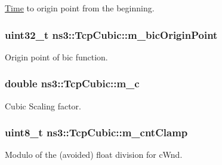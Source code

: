 \hyperlink{classns3_1_1Time}{Time} to origin point from the beginning. 

\subsubsection[{\texorpdfstring{m\+\_\+bic\+Origin\+Point}{m_bicOriginPoint}}]{\setlength{\rightskip}{0pt plus 5cm}uint32\+\_\+t ns3\+::\+Tcp\+Cubic\+::m\+\_\+bic\+Origin\+Point\hspace{0.3cm}{\ttfamily [private]}}\hypertarget{classns3_1_1TcpCubic_a10fb71cdb4155d6e61174690e6bc295a}{}\label{classns3_1_1TcpCubic_a10fb71cdb4155d6e61174690e6bc295a}


Origin point of bic function. 

\subsubsection[{\texorpdfstring{m\+\_\+c}{m_c}}]{\setlength{\rightskip}{0pt plus 5cm}double ns3\+::\+Tcp\+Cubic\+::m\+\_\+c\hspace{0.3cm}{\ttfamily [private]}}\hypertarget{classns3_1_1TcpCubic_acb9bb68447f9a9e0eb0cb1f95eb7aca7}{}\label{classns3_1_1TcpCubic_acb9bb68447f9a9e0eb0cb1f95eb7aca7}


Cubic Scaling factor. 

\subsubsection[{\texorpdfstring{m\+\_\+cnt\+Clamp}{m_cntClamp}}]{\setlength{\rightskip}{0pt plus 5cm}uint8\+\_\+t ns3\+::\+Tcp\+Cubic\+::m\+\_\+cnt\+Clamp\hspace{0.3cm}{\ttfamily [private]}}\hypertarget{classns3_1_1TcpCubic_aafd8945276979821c592ac578746a708}{}\label{classns3_1_1TcpCubic_aafd8945276979821c592ac578746a708}


Modulo of the (avoided) float division for c\+Wnd. 

